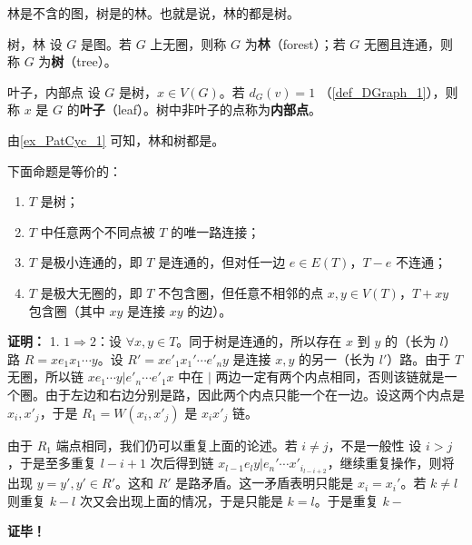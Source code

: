 
林是不含的图，树是的林。也就是说，林的都是树。

\begin{definition}{树，林}
设 $G$ 是图。若 $G$ 上无圈，则称 $G$ 为\textbf{林}（forest）；若 $G$ 无圈且连通，则称 $G$ 为\textbf{树}（tree）。
\end{definition}


\begin{definition}{叶子，内部点}
设 $G$ 是树，$x\in V(G)$。若 $d_G(v)=1$ （\autoref{def_DGraph_1}），则称 $x$ 是 $G$ 的\textbf{叶子}（leaf）。树中非叶子的点称为\textbf{内部点}。
\end{definition}

由\autoref{ex_PatCyc_1} 可知，林和树都是。


\begin{theorem}{}
下面命题是等价的：
\begin{enumerate}
\item $T$ 是树；
\item $T$ 中任意两个不同点被 $T$ 的唯一路连接；
\item $T$ 是极小连通的，即 $T$ 是连通的，但对任一边 $e\in E(T)$，$T-e$ 不连通；
\item $T$ 是极大无圈的，即 $T$ 不包含圈，但任意不相邻的点 $x,y\in V(T)$，$T+xy$ 包含圈（其中 $xy$ 是连接 $xy$ 的边）。
\end{enumerate}

\end{theorem}

\textbf{证明：}
1. $1\Rightarrow 2$：设 $\forall x,y\in T$。同于树是连通的，所以存在 $x$ 到 $y$ 的（长为 $l$）路 $R=xe_1x_1\cdots y$。设 $R'=xe'_1x_1'\cdots e'_n y$ 是连接 $x,y$ 的另一（长为 $l'$）路。由于 $T$ 无圈，所以链 $xe_1\cdots y|e'_n\cdots e'_1x$ 中在 $|$ 两边一定有两个内点相同，否则该链就是一个圈。由于左边和右边分别是路，因此两个内点只能一个在一边。设这两个内点是 $x_{i},x'_{j}$，于是 $R_1=W(x_{i},x'_{j})$ 是 $x_{i}x'_{j}$ 链。

由于 $R_1$ 端点相同，我们仍可以重复上面的论述。若 $i\neq j$，不是一般性
设 $i>j$，于是至多重复 $l-i+1$ 次后得到链 $x_{l-1}e_ly|e_n'\cdots x'_{i_{l-i+2}}$，继续重复操作，则将出现 $y=y',y'\in R'$。这和 $R'$ 是路矛盾。这一矛盾表明只能是 $x_i=x_i'$。若 $k\neq l$ 则重复 $k-l$ 次又会出现上面的情况，于是只能是 $k=l$。于是重复 $k-$



\textbf{证毕！}






















